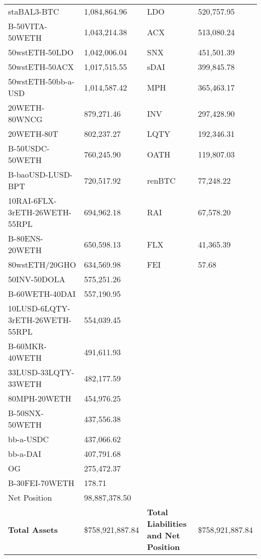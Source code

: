 \begin{longtable}{@{}p{0.25\linewidth}p{0.25\linewidth}p{0.25\linewidth}p{0.25\linewidth}@{}}
staBAL3-BTC & 1,084,864.96 & LDO &520,757.95 \\
B-50VITA-50WETH & 1,043,214.38 & ACX &513,080.24 \\
50wstETH-50LDO & 1,042,006.04 & SNX &451,501.39 \\
50wstETH-50ACX & 1,017,515.55 & sDAI &399,845.78 \\
50wstETH-50bb-a-USD & 1,014,587.42 & MPH &365,463.17 \\
20WETH-80WNCG & 879,271.46 & INV &297,428.90 \\
20WETH-80T & 802,237.27 & LQTY &192,346.31 \\
B-50USDC-50WETH & 760,245.90 & OATH &119,807.03 \\
B-baoUSD-LUSD-BPT & 720,517.92 & renBTC &77,248.22 \\
10RAI-6FLX-3rETH-26WETH-55RPL & 694,962.18 & RAI &67,578.20 \\
B-80ENS-20WETH & 650,598.13 & FLX &41,365.39 \\
80wstETH/20GHO & 634,569.98 & FEI &57.68 \\
50INV-50DOLA & 575,251.26 & & \\
B-60WETH-40DAI & 557,190.95 & & \\
10LUSD-6LQTY-3rETH-26WETH-55RPL & 554,039.45 & & \\
B-60MKR-40WETH & 491,611.93 & & \\
33LUSD-33LQTY-33WETH & 482,177.59 & & \\
80MPH-20WETH & 454,976.25 & & \\
B-50SNX-50WETH & 437,556.38 & & \\
bb-a-USDC & 437,066.62 & & \\
bb-a-DAI & 407,791.68 & & \\
OG & 275,472.37 & & \\
B-30FEI-70WETH & 178.71 & & \\
Net Position & 98,887,378.50 & & \\

\midrule

\textbf{Total Assets} & \$758,921,887.84 & \textbf{Total Liabilities and Net Position} & \$758,921,887.84 \\

\bottomrule

\end{longtable}
